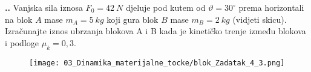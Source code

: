

\noindent 
\textbf{
\thecjelina.\thezadatak.}
Vanjska sila iznosa $F_0=42\ N$ djeluje pod kutem od $\vartheta = 30^\circ$ prema horizontali na blok $A$ mase $m_A=5 \ kg$ koji gura blok 
$B$ mase $m_B=2\ kg$ (vidjeti skicu). Izračunajte iznos ubrzanja blokova A i B kada je kinetičko trenje između blokova i podloge $\mu _k=0,3$.

\begin{figure}[h]%
  \begin{center}
    \texttt{[image: 03\_Dinamika\_materijalne\_tocke/blok\_Zadatak\_4\_3.png]}
  \end{center}
\end{figure}

